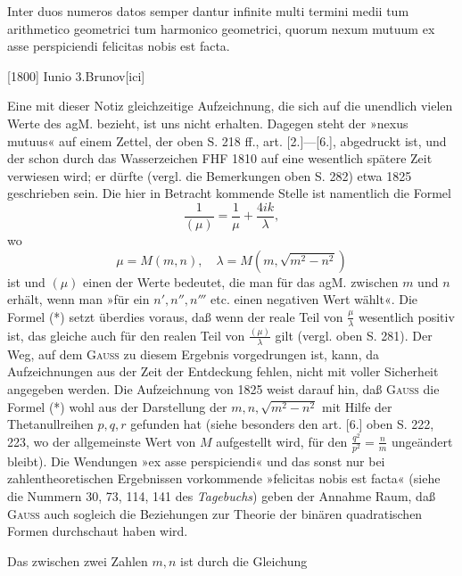 \clearpage{}
\indent Inter duos numeros datos semper dantur infinite multi termini medii tum arithmetico geometrici tum harmonico geometrici, quorum nexum mutuum ex asse perspiciendi felicitas nobis est facta.
\par\noindent\hfill[1800] Iunio 3.\quad Brunov[ici]

\medskip\begingroup\small
\makeatletter\tagsleft@true\let\veqno\@@leqno\makeatother
\renewcommand{\thefootnote}{*)}
\indent Eine mit dieser Notiz gleichzeitige Aufzeichnung, die sich auf die unendlich vielen Werte des agM. bezieht, ist uns nicht erhalten. Dagegen steht der »nexus mutuus« auf einem Zettel, der oben S. 218 ff., art. [2.]—[6.], abgedruckt ist, und der schon durch das Wasserzeichen FHF 1810 auf eine wesentlich spätere Zeit verwiesen wird; er dürfte (vergl. die Bemerkungen oben S. 282) etwa 1825 geschrieben sein. Die hier in Betracht kommende Stelle ist namentlich die Formel
\begin{equation*}
\tag*{(*)}\frac1{(\mu)}=\frac1\mu+\frac{4ik}\lambda,
\end{equation*}
\noindent wo
\[
\mu=M(m,n),\quad\lambda=M(m,\sqrt{m^2-n^2})
\]
\noindent ist und \((\mu)\) einen der Werte bedeutet, die man für das agM. zwischen \(m\) und \(n\) erhält, wenn man »für ein \(n',n'',n'''\) etc. einen negativen Wert wählt«. Die Formel (*) setzt überdies voraus, daß wenn der reale Teil von \(\frac\mu\lambda\) wesentlich positiv ist, das gleiche auch für den realen Teil von \(\frac{(\mu)}\lambda\) gilt (vergl. oben S. 281). Der Weg, auf dem \textsc{Gauss} zu diesem Ergebnis vorgedrungen ist, kann, da Aufzeichnungen aus der Zeit der Entdeckung fehlen, nicht mit voller Sicherheit angegeben werden. Die Aufzeichnung von 1825 weist darauf hin, daß \textsc{Gauss} die Formel (*) wohl aus der Darstellung der \(m,n,\sqrt{m^2-n^2}\) mit Hilfe der Thetanullreihen \(p,q,r\) gefunden hat (siehe besonders den art. [6.] oben S. 222, 223, wo der allgemeinste Wert von \(M\) aufgestellt wird, für den \(\frac{q^2}{p^2}=\frac nm\) ungeändert bleibt). Die Wendungen »ex asse perspiciendi« und das sonst nur bei zahlentheoretischen Ergebnissen vorkommende »felicitas nobis est facta« (siehe die Nummern 30, 73, 114, 141 des \textit{Tagebuchs}) geben der Annahme Raum, daß \textsc{Gauss} auch sogleich die Beziehungen zur Theorie der binären quadratischen Formen durchschaut haben wird.
\par\indent Das  zwischen zwei Zahlen \(m,n\) ist durch die Gleichung
